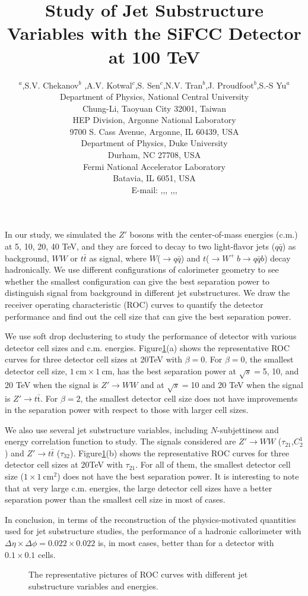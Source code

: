 \documentclass[a4paper]{PoS}
\title{Study of Jet Substructure Variables with the SiFCC Detector at 100 TeV}
\author{\speaker{Chih-Hsiang Yeh}$^a$,S.V. Chekanov$^b$ ,A.V. Kotwal$^{c}$,S. Sen$^{c}$,N.V. Tran$^{b}$,J. Proudfoot$^{b}$,S.-S Yu$^{a}$\\     
     \llap{$^a$}Department of Physics, National Central University\\
     Chung-Li, Taoyuan City 32001, Taiwan\\
     \llap{$^b$}HEP Division, Argonne National Laboratory\\
     9700 S. Cass Avenue, Argonne, IL 60439, USA\\
     \llap{$^c$}Department of Physics, Duke University\\
     Durham, NC 27708, USA\\
     \llap{$^d$}Fermi National Accelerator Laboratory\\
     Batavia, IL 6051, USA\\
     E-mail:  \email{a9510130375@gmail.com},\email{chekanov@anl.gov},\email{kotwal@phy.duke.edu},
     \email{sourav.sen@duke.edu},\email{ntran@fnal.gov},\email{proudfoot@anl.gov},\email{syu@phy.ncu.edu.tw}}
\begin{document}
In our study, we simulated the $Z'$ bosons with the center-of-mass energies (c.m.) at 5, 10, 20, 40 TeV, and they are forced to decay to two light-flavor jets ($q\bar{q}$) as background, $W W$ or $t\bar{t}$ as signal, where $W$($\rightarrow$$q\bar{q}$) and $t$($ \rightarrow  W^+\>b \rightarrow q\bar{q} b$) decay hadronically. We use different configurations of calorimeter geometry to see whether the smallest configuration can give the best separation power to distinguish signal from background in different jet substructures. We draw the receiver operating characteristic (ROC) curves to quantify the detector performance and find out the cell size that can give the best separation power.

We use soft drop declustering\cite{Larkoski:2014wba} to study the performance of detector with various detector cell sizes and c.m. energies. Figure\ref{1}(a) shows the representative ROC curves for three detector cell sizes at 20TeV with $\beta=0$. For $\beta=0$, the smallest detector cell size, $1~\mathrm{cm}\times1~\mathrm{cm}$, has the best separation power at $\sqrt{s}=$5, 10, and 20 TeV when the signal is $Z' \rightarrow WW$ and at $\sqrt{s}=$10 and 20 TeV when the signal is $Z' \rightarrow t\bar{\mathrm{t}}$. For $\beta=2$, the smallest detector cell size does not have improvements in the separation power with respect to those with larger cell sizes.

We also use several jet substructure variables, including $N$-subjettiness\cite{Thaler:2010tr} and energy correlation function\cite{Larkoski:2013eya} to study. The signals considered are $Z'\rightarrow WW$ ($\tau_{21}$,$C_2^1$) and $Z' \rightarrow t\bar{t}$ ($\tau_{32}$). Figure\ref{1}(b) shows the representative ROC curves for three detector cell sizes at 20TeV with $\tau_{21}$. For all of them, the smallest detector cell size ($1\times1~\mathrm{cm}^2$) does not have the best separation power. It is interesting to note that at very large c.m. energies, the large detector cell sizes have a better separation power than the smallest cell size in most of cases. 



In conclusion, in terms of the reconstruction of the physics-motivated quantities  
used for jet substructure studies, the  performance 
of a  hadronic callorimeter  with 
$\Delta \eta \times \Delta \phi = 0.022\times0.022$ is, in most cases,
better than for a detector with  $0.1\times0.1$ cells.


\begin{figure}
\begin{center}
\end{center}
\caption{The representative pictures of ROC curves with different jet substructure variables and energies.}
\label{1}
\end{figure}
\end{document}
